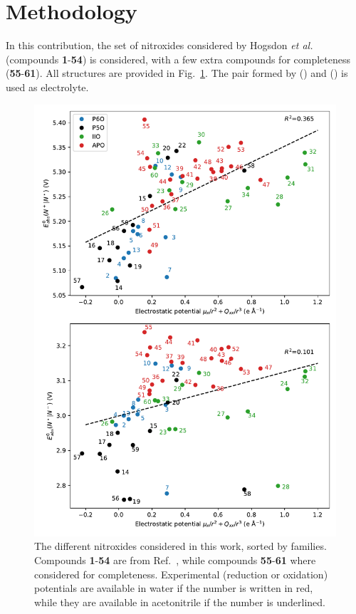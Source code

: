\documentclass[review]{elsarticle}
\begin{document}
\section{Methodology}

In this contribution, the set of nitroxides considered by Hogsdon \textit{et al.} (compounds \textbf{1}-\textbf{54}) is considered, with a few extra compounds for completeness (\textbf{55}-\textbf{61}). All structures are provided in Fig.~\ref{fig:nitroxides}. The  pair formed by  () and  () is used as electrolyte.

\begin{figure}[!p]
\centering
\includegraphics[width=\linewidth]{Figure6}
\caption{The different nitroxides considered in this work, sorted by families. Compounds \textbf{1}-\textbf{54} are from Ref.~, while compounds \textbf{55}-\textbf{61} where considered for completeness. Experimental (reduction or oxidation) potentials are available in water if the number is written in red, while they are available in acetonitrile if the number is underlined.}
\label{fig:nitroxides}
\end{figure}
\end{document}
